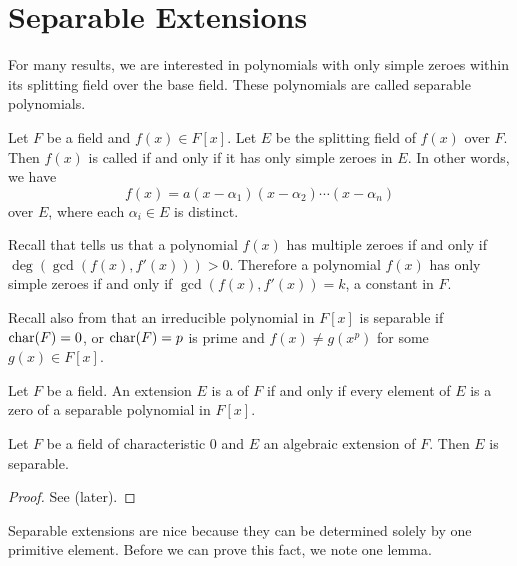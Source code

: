 \section{Separable Extensions}
For many results, we are interested in polynomials with only simple zeroes within its splitting field over the base field. These polynomials are called separable polynomials.

\begin{definition}
    Let $F$ be a field and $f(x) \in F[x]$. Let $E$ be the splitting field of $f(x)$ over $F$. Then $f(x)$ is called  if and only if it has only simple zeroes in $E$. In other words, we have
    \[
        f(x) = a(x-\alpha_1)(x-\alpha_2)\cdots(x-\alpha_n)
    \]
    over $E$, where each $\alpha_i \in E$ is distinct.
\end{definition}

Recall that  tells us that a polynomial $f(x)$ has multiple zeroes if and only if $\deg(\gcd(f(x), f'(x))) > 0$. Therefore a polynomial $f(x)$ has only simple zeroes if and only if $\gcd(f(x), f'(x)) = k$, a constant in $F$.

Recall also from  that an irreducible polynomial in $F[x]$ is separable if $\mathrm{char}(F) = 0$, or $\mathrm{char}(F) = p$ is prime and $f(x) \neq g(x^p)$ for some $g(x) \in F[x]$.

\begin{definition}
    Let $F$ be a field. An extension $E$ is a  of $F$ if and only if every element of $E$ is a zero of a separable polynomial in $F[x]$.
\end{definition}

\begin{proposition}\label{prop-algebraic-extension-of-field-of-characteristic-0-is-separable}
    Let $F$ be a field of characteristic 0 and $E$ an algebraic extension of $F$. Then $E$ is separable.
\end{proposition}
\begin{proof}
    See  (later).
\end{proof}

\pagebreak

Separable extensions are nice because they can be determined solely by one primitive element. Before we can prove this fact, we note one lemma.

